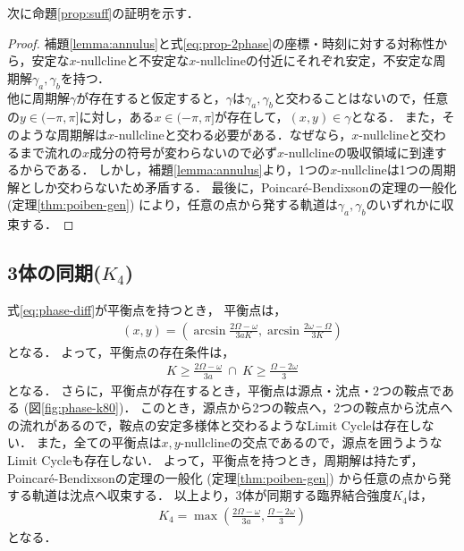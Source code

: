 \documentclass[../main]{subfiles}
\begin{document}
    次に命題\ref{prop:suff}の証明を示す．
    \begin{proof}
        補題\ref{lemma:annulus}と式\eqref{eq:prop-2phase}の座標・時刻に対する対称性から，安定な$x$-nullclineと不安定な$x$-nullclineの付近にそれぞれ安定，不安定な周期解$\gamma_a,\gamma_b$を持つ．\\
        他に周期解$\gamma$が存在すると仮定すると，$\gamma$は$\gamma_a,\gamma_b$と交わることはないので，任意の$y\in(-\pi,\pi]$に対し，ある$x\in(-\pi,\pi]$が存在して，$(x,y)\in\gamma$となる．
        また，そのような周期解は$x$-nullclineと交わる必要がある．なぜなら，$x$-nullclineと交わるまで流れの$x$成分の符号が変わらないので必ず$x$-nullclineの吸収領域に到達するからである．
        しかし，補題\ref{lemma:annulus}より，1つの$x$-nullclineは1つの周期解としか交わらないため矛盾する．
        最後に，Poincaré-Bendixsonの定理の一般化 (定理\ref{thm:poiben-gen}) により，任意の点から発する軌道は$\gamma_a,\gamma_b$のいずれかに収束する．
    \end{proof}

    \subsection{3体の同期($K_4$)}
    \label{sec:3body-k4}
    式\eqref{eq:phase-diff}が平衡点を持つとき，
    平衡点は，
    \begin{align*}
        (x,y)=\left(\arcsin \frac{2\Omega-\omega}{3aK},\arcsin \frac{2\omega-\Omega}{3K}\right)
    \end{align*}
    となる．
    よって，平衡点の存在条件は，
    \begin{align*}
        K\geq \frac{2\Omega-\omega}{3a}\ \cap \ K\geq \frac{\Omega-2\omega}{3}
    \end{align*}
    となる．
    さらに，平衡点が存在するとき，平衡点は源点・沈点・2つの鞍点である (図\ref{fig:phase-k80})．
    このとき，源点から2つの鞍点へ，2つの鞍点から沈点への流れがあるので，鞍点の安定多様体と交わるようなLimit Cycleは存在しない．
    また，全ての平衡点は$x,y$-nullclineの交点であるので，源点を囲うようなLimit Cycleも存在しない．
    よって，平衡点を持つとき，周期解は持たず，Poincaré-Bendixsonの定理の一般化 (定理\ref{thm:poiben-gen}) から任意の点から発する軌道は沈点へ収束する．
    以上より，3体が同期する臨界結合強度$K_4$は，
    \begin{align*}
        K_4=\max\left(\frac{2\Omega-\omega}{3a},\frac{\Omega-2\omega}{3}\right)
    \end{align*}
    となる．
    
\end{document}
